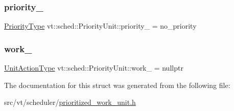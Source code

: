 \subsubsection{\texorpdfstring{priority\+\_\+}{priority\_}}
{\footnotesize\ttfamily \hyperlink{namespacevt_a86bff9f556eb761b27fc8600d006ac04}{Priority\+Type} vt\+::sched\+::\+Priority\+Unit\+::priority\+\_\+ = no\+\_\+priority\hspace{0.3cm}{\ttfamily [private]}}

\mbox{\label{structvt_1_1sched_1_1_priority_unit_ab8b3a78c58c74378e0d03de0e10af30d}} 
\subsubsection{\texorpdfstring{work\+\_\+}{work\_}}
{\footnotesize\ttfamily \hyperlink{structvt_1_1sched_1_1_priority_unit_aadc2c7160cb86f45260dbdd2d39b1b68}{Unit\+Action\+Type} vt\+::sched\+::\+Priority\+Unit\+::work\+\_\+ = nullptr\hspace{0.3cm}{\ttfamily [private]}}



The documentation for this struct was generated from the following file\+:\begin{DoxyCompactItemize}
\item 
src/vt/scheduler/\hyperlink{prioritized__work__unit_8h}{prioritized\+\_\+work\+\_\+unit.\+h}\end{DoxyCompactItemize}
